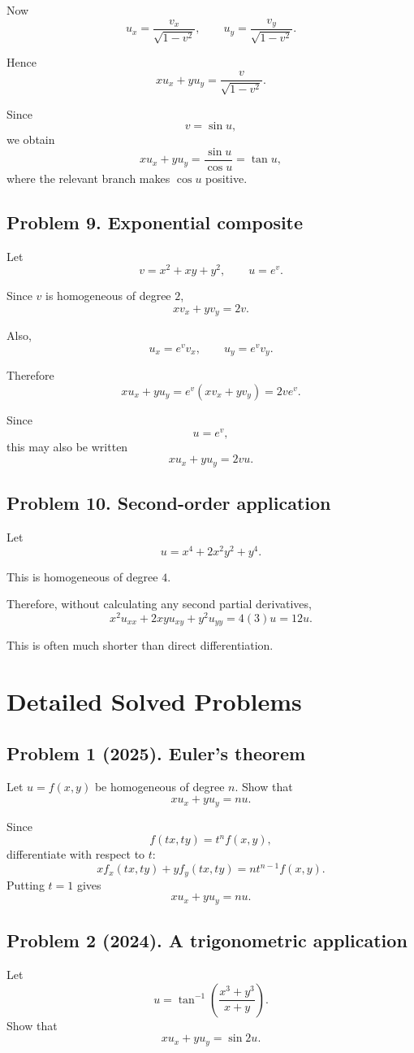 \documentclass[11pt,oneside]{book}
\theoremstyle{studentthm}
\theoremstyle{definition}
\begin{document}
Now
\[
u_x
=
\frac{v_x}{\sqrt{1-v^2}},
\qquad
u_y
=
\frac{v_y}{\sqrt{1-v^2}}.
\]

Hence
\[
xu_x+yu_y
=
\frac{v}{\sqrt{1-v^2}}.
\]

Since
\[
v=\sin u,
\]
we obtain
\[
xu_x+yu_y
=
\frac{\sin u}{\cos u}
=
\tan u,
\]
where the relevant branch makes \(\cos u\) positive.

\subsection*{Problem 9. Exponential composite}

Let
\[
v=x^2+xy+y^2,
\qquad
u=e^v.
\]

Since \(v\) is homogeneous of degree \(2\),
\[
xv_x+yv_y=2v.
\]

Also,
\[
u_x=e^v v_x,
\qquad
u_y=e^v v_y.
\]

Therefore
\[
xu_x+yu_y
=
e^v(xv_x+yv_y)
=
2ve^v.
\]

Since
\[
u=e^v,
\]
this may also be written
\[
xu_x+yu_y=2vu.
\]

\subsection*{Problem 10. Second-order application}

Let
\[
u=x^4+2x^2y^2+y^4.
\]

This is homogeneous of degree \(4\).

Therefore, without calculating any second partial derivatives,
\[
x^2u_{xx}
+
2xyu_{xy}
+
y^2u_{yy}
=
4(3)u
=
12u.
\]

This is often much shorter than direct differentiation.


\section{Detailed Solved Problems}

\subsection*{Problem 1 (2025). Euler's theorem}
Let \(u=f(x,y)\) be homogeneous of degree \(n\). Show that
\[
xu_x+yu_y=nu.
\]

Since
\[
f(tx,ty)=t^n f(x,y),
\]
differentiate with respect to \(t\):
\[
x f_x(tx,ty)+y f_y(tx,ty)
=
nt^{n-1}f(x,y).
\]
Putting \(t=1\) gives
\[
xu_x+yu_y=nu.
\]

\subsection*{Problem 2 (2024). A trigonometric application}
Let
\[
u
=
\tan^{-1}
\left(
\frac{x^3+y^3}{x+y}
\right).
\]
Show that
\[
xu_x+yu_y=\sin2u.
\]
\end{document}
